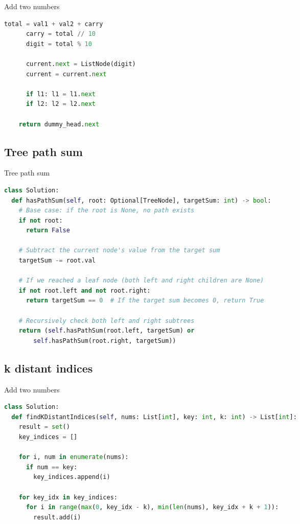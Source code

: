 \documentclass[a4paper,12pt]{article}
\begin{document}
\begin{multicols}{2}
\begin{mycode}[label={lst:add-two-numbers}]{Add two numbers}
\begin{lstlisting}[language=Python]
      total = val1 + val2 + carry
      carry = total // 10
      digit = total % 10

      current.next = ListNode(digit)
      current = current.next

      if l1: l1 = l1.next
      if l2: l2 = l2.next

    return dummy_head.next
\end{lstlisting}
\end{mycode}

\subsection{Tree path sum}
\begin{mycode}[label={lst:tree-path-sum}]{Tree path sum}
\begin{lstlisting}[language=Python]
class Solution:
  def hasPathSum(self, root: Optional[TreeNode], targetSum: int) -> bool:
    # Base case: if the root is None, no path exists
    if not root:
      return False
    
    # Subtract the current node's value from the target sum
    targetSum -= root.val
    
    # If we reached a leaf node (both left and right children are None)
    if not root.left and not root.right:
      return targetSum == 0  # If the target sum becomes 0, return True
    
    # Recursively check both left and right subtrees
    return (self.hasPathSum(root.left, targetSum) or 
        self.hasPathSum(root.right, targetSum))
\end{lstlisting}
\end{mycode}

\subsection{k distant indices}
\begin{mycode}[label={lst:add-two-numbers}]{Add two numbers}
\begin{lstlisting}[language=Python]
class Solution:
  def findKDistantIndices(self, nums: List[int], key: int, k: int) -> List[int]:
    result = set()
    key_indices = []
    
    for i, num in enumerate(nums):
      if num == key:
        key_indices.append(i)

    for key_idx in key_indices:
      for i in range(max(0, key_idx - k), min(len(nums), key_idx + k + 1)):
        result.add(i)


\end{lstlisting}
\end{mycode}
\end{multicols}
\end{document}
